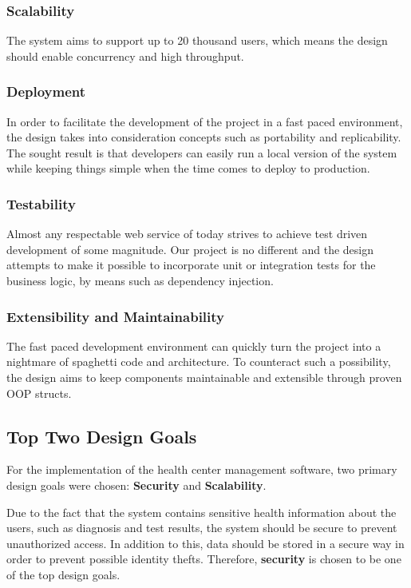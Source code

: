 \documentclass[a4paper, 12pt, titlepage]{article}
\begin{document}
  \subsubsection{Scalability}

  The system aims to support up to 20 thousand users, which means the design should enable concurrency and high throughput.

  \subsubsection{Deployment}

  In order to facilitate the development of the project in a fast paced environment,
  the design takes into consideration concepts such as portability and replicability.
  The sought result is that developers can easily run a local version of the system while
  keeping things simple when the time comes to deploy to production.

  \subsubsection{Testability}

  Almost any respectable web service of today strives to achieve test driven development of some magnitude.
  Our project is no different and the design attempts to make it possible to incorporate unit or integration tests
  for the business logic, by means such as dependency injection.

  \subsubsection{Extensibility and Maintainability}

  The fast paced development environment can quickly turn the project into a nightmare of spaghetti code and architecture.
  To counteract such a possibility, the design aims to keep components maintainable and extensible through proven OOP structs.

  \subsection{Top Two Design Goals}

  For the implementation of the health center management software, two primary design goals were chosen:
  \textbf{Security} and \textbf{Scalability}.

  Due to the fact that the system contains sensitive health information about the users, such as diagnosis and test results,
  the system should be secure to prevent unauthorized access. In addition to this, data should be stored in a secure way
  in order to prevent possible identity thefts. Therefore, \textbf{security} is chosen to be one of the top design goals.
\end{document}
